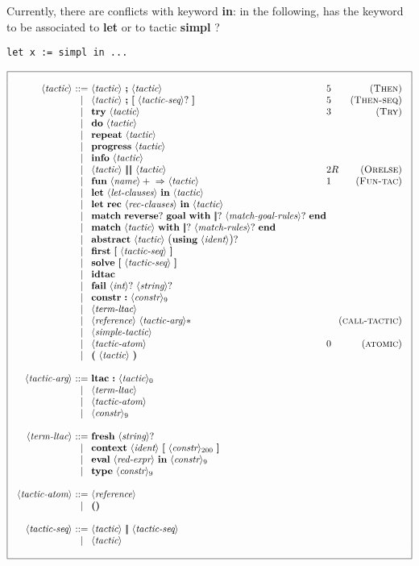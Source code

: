 \documentclass{article}
\makeatletter
\def\bfbar{\ensuremath{|\hskip -0.22em{}|\hskip -0.24em{}|}}
\def\TERMbar{\bfbar}
\def\TERMbarbar{\bfbar\bfbar}
\def\GR#1{\text{\large(}#1\text{\large)}}
\def\NT#1{\langle\textit{#1}\rangle}
\def\NTL#1#2{\langle\textit{#1}\rangle_{#2}}
\def\TERM#1{{\bf\textrm{\bf #1}}}
\def\KWD#1{\TERM{#1}}
\def\STAR#1{#1*}
\def\PLUS#1{#1+}
\def\OPT#1{#1?}
\def\OPTGR#1{\GR{#1}?}
\newenvironment{cadre}
        {\begin{array}{|c|}\hline\\}
        {\\\\\hline\end{array}}
\newenvironment{rulebox}
        {$$\begin{cadre}\begin{array}{r@{~}c@{~}l@{}l@{}r}}
        {\end{array}\end{cadre}$$}
\def\DEFNT#1{\NT{#1} & ::= &}
\def\RNAME#1{(\textsc{#1})}
\def\SEPDEF{\\\\}
\def\nlsep{\\&|&}
\newenvironment{rules}
        {\begin{center}\begin{rulebox}}
        {\end{rulebox}\end{center}}
\makeatother
\begin{document}
Currently, there are conflicts with keyword \KWD{in}: in the following,
has the keyword to be associated to \KWD{let} or to tactic \TERM{simpl} ?
\begin{center}
\texttt{let x := simpl in ...}
\end{center}


\begin{rules}
\DEFNT{tactic}
       \NT{tactic} ~\KWD{;} ~\NT{tactic}  &5 &\RNAME{Then}
\nlsep \NT{tactic} ~\KWD{;}~\TERM{[} ~\OPT{\NT{tactic-seq}} ~\TERM{]}
         &5 &\RNAME{Then-seq}
\nlsep \TERM{try} ~\NT{tactic}     &3 &\RNAME{Try}
\nlsep \TERM{do} ~\NT{tactic}
\nlsep \TERM{repeat} ~\NT{tactic}
\nlsep \TERM{progress} ~\NT{tactic}
\nlsep \TERM{info} ~\NT{tactic}
\nlsep \NT{tactic} ~\TERMbarbar ~\NT{tactic} &2R &\RNAME{Orelse}
\nlsep \KWD{fun} ~\PLUS{\NT{name}} ~\KWD{$\Rightarrow$}
       ~\NT{tactic}  &1 &\RNAME{Fun-tac}
\nlsep \KWD{let} ~\NT{let-clauses} ~\KWD{in} ~\NT{tactic}
\nlsep \KWD{let} ~\TERM{rec} ~\NT{rec-clauses} ~\KWD{in} ~\NT{tactic}
\nlsep \KWD{match}~\OPT{\TERM{reverse}}~\TERM{goal}~\KWD{with}
       ~\OPT{\TERMbar}~\OPT{\NT{match-goal-rules}} ~\KWD{end}
\nlsep \KWD{match} ~\NT{tactic} ~\KWD{with}
       ~\OPT{\TERMbar}~\OPT{\NT{match-rules}} ~\KWD{end}
\nlsep \TERM{abstract}~\NT{tactic}~\OPTGR{\TERM{using}~\NT{ident}}
\nlsep \TERM{first}~\TERM{[} ~\NT{tactic-seq} ~\TERM{]}
\nlsep \TERM{solve}~\TERM{[} ~\NT{tactic-seq} ~\TERM{]}
\nlsep \TERM{idtac}
\nlsep \TERM{fail} ~\OPT{\NT{int}} ~\OPT{\NT{string}}
\nlsep \TERM{constr}~\KWD{:}~\tacconstr
\nlsep \NT{term-ltac}
\nlsep \NT{reference}~\STAR{\NT{tactic-arg}}  &&\RNAME{call-tactic}
\nlsep \NT{simple-tactic}
\nlsep \NT{tactic-atom}  &0 &\RNAME{atomic}
\nlsep \KWD{(} ~\NT{tactic} ~\KWD{)}
\SEPDEF
\DEFNT{tactic-arg}
       \TERM{ltac}~\KWD{:}~\NTL{tactic}{0}
\nlsep \NT{term-ltac}
\nlsep \NT{tactic-atom}
\nlsep \tacconstr
\SEPDEF
\DEFNT{term-ltac}
       \TERM{fresh} ~\OPT{\NT{string}}
\nlsep \TERM{context} ~\NT{ident} ~\TERM{[} ~\taclconstr ~\TERM{]}
\nlsep \TERM{eval} ~\NT{red-expr} ~\KWD{in} ~\tacconstr
\nlsep \TERM{type} ~\tacconstr
\SEPDEF
\DEFNT{tactic-atom}
       \NT{reference}
\nlsep \TERM{()}
\SEPDEF
\DEFNT{tactic-seq}
       \NT{tactic} ~\TERMbar ~\NT{tactic-seq}
\nlsep \NT{tactic}
\end{rules}
\end{document}
